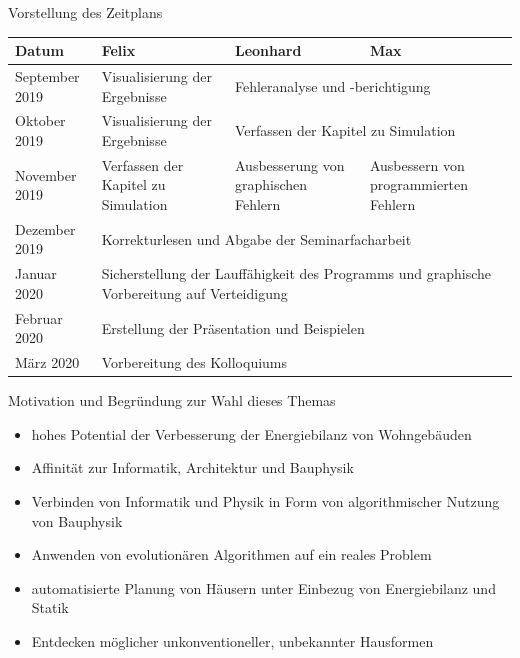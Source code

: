 \documentclass[11pt]{beamer}
\begin{document}
\begin{frame}{Vorstellung des Zeitplans}
\begin{footnotesize}
\begin{tabular}{|p{2cm}||p{2.5cm}|p{2.5cm}|p{2.5cm}|} \hline
   Datum & Felix & Leonhard & Max \\ \hline \hline
   September 2019 & Visualisierung der Ergebnisse & \multicolumn{2}{|p{5cm}|}{Fehleranalyse und -berichtigung} \\ \hline
   Oktober 2019 & Visualisierung der Ergebnisse & \multicolumn{2}{|p{5cm}|}{Verfassen der Kapitel zu Simulation} \\ \hline
   November 2019 & Verfassen der Kapitel zu Simulation & Ausbesserung von graphischen Fehlern & Ausbessern von programmierten Fehlern \\ \hline
   Dezember 2019 & \multicolumn{3}{|p{7.5cm}|}{Korrekturlesen und Abgabe der Seminarfacharbeit} \\ \hline
    Januar 2020 & \multicolumn{3}{|p{7.5cm}|}{Sicherstellung der Lauffähigkeit des Programms und graphische Vorbereitung auf Verteidigung} \\ \hline
     Februar 2020 & \multicolumn{3}{|p{7.5cm}|}{Erstellung der Präsentation und Beispielen} \\ \hline
      März 2020 & \multicolumn{3}{|p{7.5cm}|}{Vorbereitung des Kolloquiums} \\ \hline
\end{tabular}
\end{footnotesize}
\end{frame}
\begin{frame}{Motivation und Begründung zur Wahl dieses Themas}
\begin{itemize}
\pause
\item{hohes Potential der Verbesserung der Energiebilanz von Wohngebäuden}\pause
\item{Affinität zur Informatik, Architektur und Bauphysik}\pause
\item{Verbinden von Informatik und Physik in Form von algorithmischer Nutzung von Bauphysik}\pause
\item{Anwenden von evolutionären Algorithmen auf ein reales Problem}\pause
\item{automatisierte Planung von Häusern unter Einbezug von Energiebilanz und Statik}\pause
\item{Entdecken möglicher unkonventioneller, unbekannter Hausformen}
\end{itemize}
\end{frame}
\end{document}
